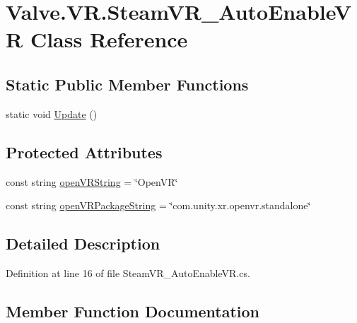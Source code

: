 \hypertarget{class_valve_1_1_v_r_1_1_steam_v_r___auto_enable_v_r}{}\section{Valve.\+V\+R.\+Steam\+V\+R\+\_\+\+Auto\+Enable\+VR Class Reference}
\label{class_valve_1_1_v_r_1_1_steam_v_r___auto_enable_v_r}
\subsection*{Static Public Member Functions}
\begin{DoxyCompactItemize}
\item 
static void \mbox{\hyperlink{class_valve_1_1_v_r_1_1_steam_v_r___auto_enable_v_r_a039a896ec5aa43f759243e5430f8bb14}{Update}} ()
\end{DoxyCompactItemize}
\subsection*{Protected Attributes}
\begin{DoxyCompactItemize}
\item 
const string \mbox{\hyperlink{class_valve_1_1_v_r_1_1_steam_v_r___auto_enable_v_r_aad2df628366f5d024088acafb05e5b13}{open\+V\+R\+String}} = \char`\"{}Open\+VR\char`\"{}
\item 
const string \mbox{\hyperlink{class_valve_1_1_v_r_1_1_steam_v_r___auto_enable_v_r_afe964c4b4fb43beb8d04b109500b74f9}{open\+V\+R\+Package\+String}} = \char`\"{}com.\+unity.\+xr.\+openvr.\+standalone\char`\"{}
\end{DoxyCompactItemize}


\subsection{Detailed Description}


Definition at line 16 of file Steam\+V\+R\+\_\+\+Auto\+Enable\+V\+R.\+cs.



\subsection{Member Function Documentation}
\mbox{\label{class_valve_1_1_v_r_1_1_steam_v_r___auto_enable_v_r_a039a896ec5aa43f759243e5430f8bb14}} 
